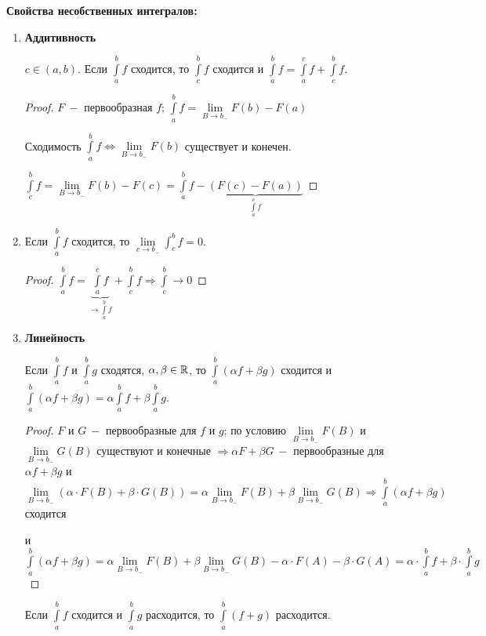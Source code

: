 \begin{statement}
    \textbf{Свойства несобственных интегралов:}
    \begin{enumerate}
        \item \textbf{Аддитивность}

        $c\in (a, b)$. Если $\int\limits_a^b f$ сходится, то $\int\limits_c^b f$ сходится и $\int\limits_a^b f=\int\limits_a^c f+\int\limits_c^b f$.

        \begin{proof}
            $F\ -$ первообразная $f$; $\int\limits_a^b f = \lim\limits_{B\rightarrow b_-}F(b)-F(a)$

            Сходимость $\int\limits_a^b f\Leftrightarrow \lim\limits_{B\rightarrow b_-}F(b)$ существует и конечен.

            $\int\limits_c^b f=\lim\limits_{B\rightarrow b_-}F(b)-F(c)=\int\limits_a^b f - \underbrace{(F(c)-F(a))}_{\int\limits_a^c f}$
        \end{proof}
        \item Если $\int\limits_a^b f$ сходится, то $\lim\limits_{c\rightarrow b_-}\int_c^b f=0$.
        \begin{proof}
            $\int\limits_a^b f=\underbrace{\int\limits_a^c f}_{\rightarrow \int\limits_a^b f} + \int\limits_c^b f\Rightarrow \int\limits_c^b\rightarrow 0$
        \end{proof}
        \item \textbf{Линейность}
    
        Если $\int\limits_a^b f$ и $\int\limits_a^b g$ сходятся, $\alpha, \beta\in \mathbb{R}$, то $\int\limits_a^b(\alpha f+\beta g)$ сходится и $\int\limits_a^b(\alpha f+\beta g)=\alpha\int\limits_a^b f+\beta \int\limits_a^b g$.
        \begin{proof}
            $F$ и $G\ -$ первообразные для $f$ и $g$; по условию $\lim\limits_{B\rightarrow b_-} F(B)$ и $\lim\limits_{B\rightarrow b_-} G(B)$ существуют и конечные $\Rightarrow\alpha F + \beta G\ -$ первообразные для $\alpha f + \beta g$ и $\lim\limits_{B\rightarrow b_-}(\alpha\cdot F(B) + \beta\cdot G(B))=\alpha\lim\limits_{B\rightarrow b_-}F(B) + \beta\lim\limits_{B\rightarrow b_-} G(B)\Rightarrow \int\limits_a^b (\alpha f + \beta g)$ сходится 
            
            и $\int\limits_a^b (\alpha f + \beta g)=\alpha\lim\limits_{B\rightarrow b_-}F(B) + \beta\lim\limits_{B\rightarrow b_-} G(B)-\alpha \cdot F(A) - \beta \cdot G(A)=\alpha \cdot \int\limits_a^b f+\beta \cdot \int\limits_a^b g$  
        \end{proof}
        \begin{remark}
            Если $\int\limits_a^b f$ сходится и $\int\limits_a^b g$ расходится, то $\int\limits_a^b(f+g)$ расходится.
        \end{remark}


\end{enumerate}
\end{statement}
